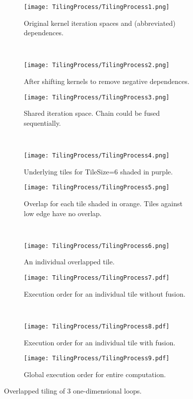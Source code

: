 \begin{figure*}
	\centering

	\begin{subfigure}[t]{0.5\textwidth}
		\centering
		\texttt{[image: TilingProcess/TilingProcess1.png]}
		\caption{Original kernel iteration spaces and (abbreviated) dependences.}
		\label{tiling1}
	\end{subfigure}
	~
	\begin{subfigure}[t]{0.5\textwidth}
		\centering
		\texttt{[image: TilingProcess/TilingProcess2.png]}
		\caption{After shifting kernels to remove negative dependences.}
		\label{tiling2}
	\end{subfigure}
	\par\bigskip
	\begin{subfigure}[t]{0.5\textwidth}
		\centering
		\texttt{[image: TilingProcess/TilingProcess3.png]}
		\caption{Shared iteration space. Chain could be fused sequentially.}
		\label{tiling3}
	\end{subfigure}
	~
	\begin{subfigure}[t]{0.5\textwidth}
		\centering
		\texttt{[image: TilingProcess/TilingProcess4.png]}
		\caption{Underlying tiles for TileSize=6 shaded in purple.}
		\label{tiling4}
	\end{subfigure}
	\par\bigskip
	\begin{subfigure}[t]{0.5\textwidth}
		\centering
		\texttt{[image: TilingProcess/TilingProcess5.png]}
		\caption{Overlap for each tile shaded in orange. Tiles against low edge have no overlap.}
	\end{subfigure}
	~
	\begin{subfigure}[t]{0.5\textwidth}
		\centering
		\texttt{[image: TilingProcess/TilingProcess6.png]}
		\caption{An individual overlapped tile.}
	\end{subfigure}
	\par\bigskip
	\begin{subfigure}[t]{0.5\textwidth}
		\centering
		\texttt{[image: TilingProcess/TilingProcess7.pdf]}
		\caption{Execution order for an individual tile without fusion.}
		\label{tileNofuse}
	\end{subfigure}
	~
	\begin{subfigure}[t]{0.5\textwidth}
		\centering
		\texttt{[image: TilingProcess/TilingProcess8.pdf]}
		\caption{Execution order for an individual tile with fusion.}
		\label{tileFuse}
	\end{subfigure}
	\par\bigskip
	\begin{subfigure}[t]{\textwidth}
		\centering
		\texttt{[image: TilingProcess/TilingProcess9.pdf]}
		\caption{Global execution order for entire computation.}
		\label{tiling9}
	\end{subfigure}
\label{tilingProcess}
\caption{Overlapped tiling of 3 one-dimensional loops.}
\end{figure*}


